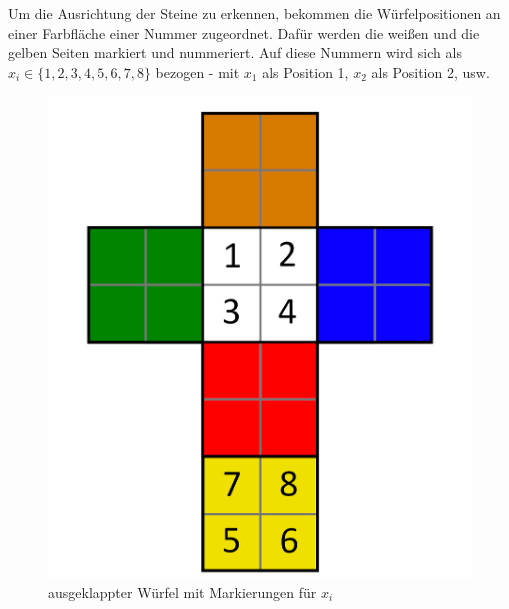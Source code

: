 \documentclass[12pt,a4paper, usenames, dvipsnames]{article}
\begin{document}
Um die Ausrichtung der Steine zu erkennen, bekommen die Würfelpositionen an einer Farbfläche einer Nummer zugeordnet. Dafür werden die weißen und die gelben Seiten markiert und nummeriert. Auf diese Nummern wird sich als $x_i \in \lbrace 1, 2, 3, 4, 5, 6, 7, 8 \rbrace$ bezogen - mit $x_1$ als Position 1, $x_2$ als Position 2, usw.
\begin{figure}[h]
\centering
\includegraphics[scale=0.1]{foldedout_numbers.png}
\caption{ausgeklappter Würfel mit Markierungen für $x_i$}
\end{figure}
\end{document}
